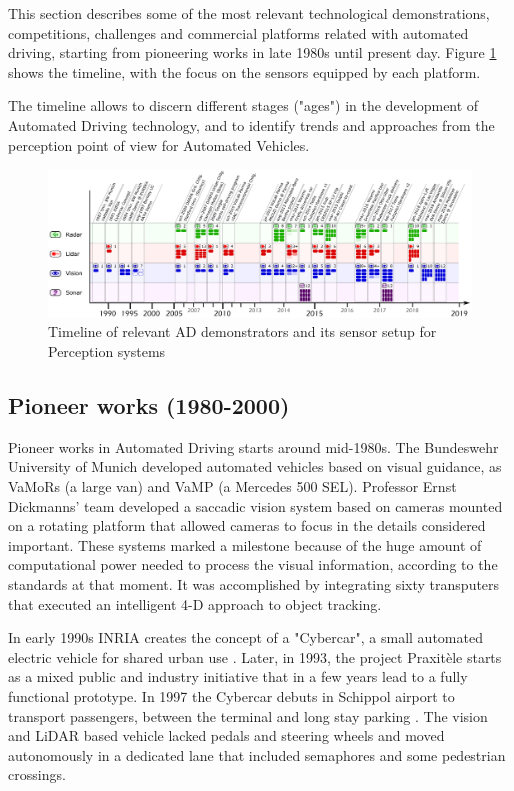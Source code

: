 This section describes some of the most relevant technological demonstrations, competitions, challenges and commercial platforms related with automated driving, starting from pioneering works in late 1980s until present day. Figure \ref{fig:tech-demos} shows the timeline, with the focus on the sensors equipped by each platform.

The timeline allows to discern different stages ("ages") in the development of Automated Driving technology, and to identify trends and approaches from the perception point of view for Automated Vehicles.

\begin{figure}[p] %
  \includegraphics[width=0.95\textheight,angle=90,keepaspectratio]{"img/AD_demos_Timeline"}
  \caption{Timeline of relevant AD demonstrators and its sensor setup for 
      Perception systems}
  \label{fig:tech-demos}
\end{figure}

\subsection{Pioneer works (1980-2000)}

Pioneer works in Automated Driving starts around mid-1980s. The Bundeswehr 
University of Munich developed automated vehicles based on visual guidance, as 
VaMoRs \cite{Dickmanns1987} (a large van) and VaMP \cite{Gregor2002} (a 
Mercedes 500 SEL). Professor Ernst Dickmanns' team developed a saccadic vision 
system based on cameras mounted on a rotating platform that allowed cameras to 
focus in the details considered important.
These systems marked a milestone because of the huge amount of computational 
power needed to process the visual information, according to the standards at 
that moment. It was accomplished by integrating sixty transputers that executed 
an intelligent 4-D approach to object tracking.

In early 1990s INRIA creates the concept of a "Cybercar", a small automated 
electric vehicle for shared urban use \cite{Parent1993}. Later, in 1993, the project 
Praxitèle \cite{Massot1999} starts as a mixed public and industry initiative that in a 
few years lead to a fully functional prototype. 
In 1997 the Cybercar debuts in Schippol airport to transport passengers, between the terminal and long stay parking \cite{Ozguner2007}. The vision and LiDAR based vehicle lacked pedals and steering wheels and moved autonomously in a dedicated lane that included semaphores and some pedestrian crossings.

